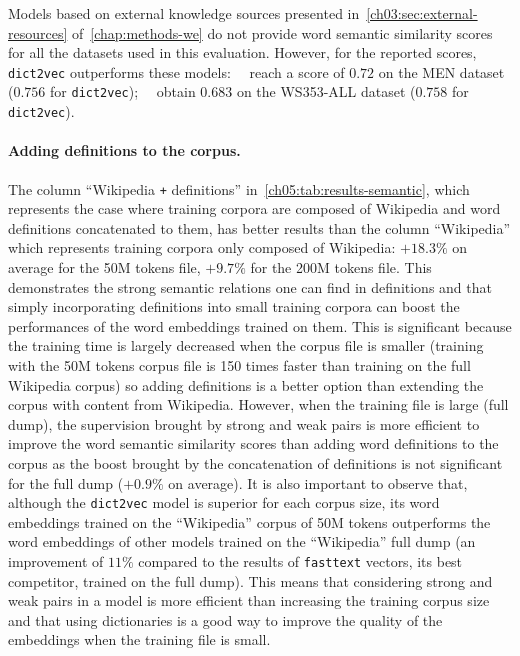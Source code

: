       Models based on external knowledge sources presented
      in~\autoref{ch03:sec:external-resources} of~\autoref{chap:methods-we} do
      not provide word semantic similarity scores for all the datasets used in
      this evaluation. However, for the reported scores, \texttt{dict2vec}
      outperforms these
      models:~\citeauthor{kiela2015specializing}~\citep{kiela2015specializing}
      reach a score of $0.72$ on the MEN dataset ($0.756$ for
      \texttt{dict2vec});~\citeauthor{xu2014rc}~\citep{xu2014rc} obtain $0.683$
      on the WS353-ALL dataset ($0.758$ for \texttt{dict2vec}).

    \paragraph{Adding definitions to the corpus.}
      The column ``Wikipedia \texttt{+} definitions''
      in~\autoref{ch05:tab:results-semantic}, which represents the case where
      training corpora are composed of Wikipedia and word definitions
      concatenated to them, has better results than the column ``Wikipedia''
      which represents training corpora only composed of Wikipedia: $+18.3\%$ on
      average for the 50M tokens file, $+9.7\%$ for the 200M tokens file. This
      demonstrates the strong semantic relations one can find in definitions and
      that simply incorporating definitions into small training corpora can
      boost the performances of the word embeddings trained on them. This is
      significant because the training time is largely decreased when the corpus
      file is smaller (training with the 50M tokens corpus file is 150 times
      faster than training on the full Wikipedia corpus) so adding definitions
      is a better option than extending the corpus with content from Wikipedia.
      However, when the training file is large (full dump), the supervision
      brought by strong and weak pairs is more efficient to improve the word
      semantic similarity scores than adding word definitions to the corpus as
      the boost brought by the concatenation of definitions is not significant
      for the full dump ($+0.9\%$ on average). It is also important to observe
      that, although the \texttt{dict2vec} model is superior for each corpus
      size, its word embeddings trained on the ``Wikipedia'' corpus of 50M
      tokens outperforms the word embeddings of other models trained on the
      ``Wikipedia'' full dump (an improvement of $11\%$ compared to the results
      of \texttt{fasttext} vectors, its best competitor, trained on the full
      dump). This means that considering strong and weak pairs in a model is
      more efficient than increasing the training corpus size and that using
      dictionaries is a good way to improve the quality of the embeddings when
      the training file is small.


